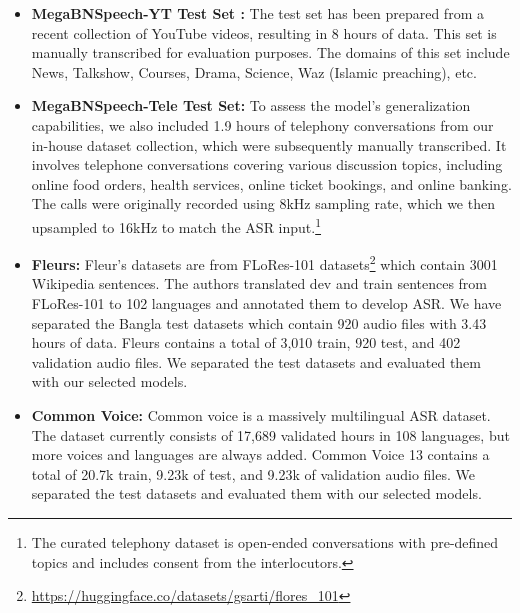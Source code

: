 
\begin{itemize}
     \item \textbf{MegaBNSpeech-YT Test Set :}
    The test set has been prepared from a recent collection of YouTube videos, resulting in 8 hours of data. This set is manually transcribed for evaluation purposes. The domains of this set include News, Talkshow, Courses, Drama, Science, Waz (Islamic preaching), etc.
    \item \textbf{MegaBNSpeech-Tele Test Set:} To assess the model's generalization capabilities, we also included 1.9 hours of telephony conversations from our in-house dataset collection, which were subsequently manually transcribed. It involves telephone conversations covering various discussion topics, including online food orders, health services, online ticket bookings, and online banking. The calls were originally recorded using 8kHz sampling rate, which we then upsampled to 16kHz to match the ASR input.\footnote{The curated telephony dataset is open-ended conversations with pre-defined topics and includes consent from the interlocutors.}
    
    \item \textbf{Fleurs:} Fleur's \cite{conneau2023fleurs} datasets are from FLoRes-101 datasets\footnote{\url{https://huggingface.co/datasets/gsarti/flores_101}} which contain 3001 Wikipedia sentences. The authors translated dev and train sentences from FLoRes-101 to 102 languages and annotated them to develop ASR. We have separated the Bangla test datasets which contain 920 audio files with 3.43 hours of data. Fleurs contains a total of 3,010 train, 920 test, and 402 validation audio files. We separated the test datasets and evaluated them with our selected models.
    \item \textbf{Common Voice:} Common voice \cite{ardila2019common} is a massively multilingual ASR dataset. The dataset currently consists of 17,689 validated hours in 108 languages, but more voices and languages are always added. Common Voice 13 contains a total of 20.7k train, 9.23k of test, and 9.23k of validation audio files. We separated the test datasets and evaluated them with our selected models.
\end{itemize}

